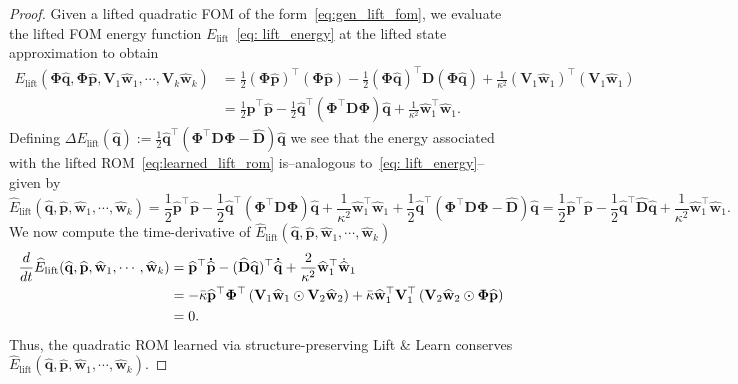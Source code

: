\documentclass[10pt,a4paper]{amsart}
\newcommand{\D}{\mathbf D}
\newcommand{\Dhat}{\widehat{\D}}
\newcommand{\V}{\mathbf V}
\newcommand{\bPhi}{\mathbf{\Phi}}
\newcommand{\dd}{\rm d}
\newcommand{\p}{\mathbf p}
\newcommand{\phat}{\widehat{\p}}
\newcommand{\phatdot}{\mathbf{\dot{\widehat p}}}
\newcommand{\q}{\mathbf q}
\newcommand{\qhat}{\widehat{\q}}
\newcommand{\qhatdot}{\mathbf{\dot{\widehat q}}}
\newcommand{\w}{\mathbf w}
\newcommand{\what}{\widehat{\w}}
\begin{document}
\begin{proof}
Given a lifted quadratic FOM of the form~\eqref{eq:gen_lift_fom}, we evaluate the lifted FOM energy function $E_{\text{lift}}$~\eqref{eq: lift_energy} at the lifted state approximation to obtain
\begin{align}
\label{eq:lift_energy}
E_{\text{lift}}(\bPhi\qhat,\bPhi\phat,\V_{1}\what_1, \cdots,\V_{k}\what_{k})&=\frac{1}{2}(\bPhi\phat)^\top(\bPhi\phat) - \frac{1}{2}(\bPhi\qhat)^\top \D(\bPhi\qhat) + \frac{1}{\kappa^2}(\V_{1}\what_1)^\top(\V_{1}\what_1) \nonumber\\
&=\frac{1}{2}\phat^\top\phat - \frac{1}{2}\qhat^\top (\bPhi^\top\D\bPhi )\qhat + \frac{1}{\kappa^2}\what_1^\top\what_1.
\end{align}
Defining $\Delta E_{\mathrm{lift}}(\qhat):=\frac{1}{2}\qhat^\top (\bPhi^\top\D\bPhi-\Dhat)\qhat$ we see that the energy associated with the lifted ROM~\eqref{eq:learned_lift_rom} is--analogous to~\eqref{eq: lift_energy}--given by
\begin{equation*}
\widehat{E}_{\text{lift}}(\qhat,\phat,\what_1, \cdots,  \what_{k})=\frac{1}{2}\phat^\top\phat - \frac{1}{2}\qhat^\top (\bPhi^\top\D\bPhi )\qhat + \frac{1}{\kappa^2}\what_1^\top\what_1 + \frac{1}{2}\qhat^\top (\bPhi^\top\D\bPhi-\Dhat)\qhat=\frac{1}{2}\phat^\top\phat - \frac{1}{2}\qhat^\top \Dhat\qhat +\frac{1}{\kappa^2} \what_1^\top\what_1. 
\end{equation*}
We now compute the time-derivative of $\widehat{E}_{\text{lift}}(\qhat,\phat,\what_1, \cdots,  \what_{k})$
\begin{align*} 
    \frac{\dd}{\dd t}\widehat{E}_{\text{lift}}(\qhat,\phat,\what_1, \cdots,\what_{k})&=\phat^\top\phatdot - (\Dhat\qhat)^\top\qhatdot +\frac{2}{\kappa^2} \what_1^\top\dot{\what}_1 \\
    &=-\bar{\kappa}\phat^\top\bPhi^\top\left( \V_{1}\what_1 \odot  \V_{2}\what_2\right) +  \bar{\kappa} \what_1^\top\V_{1}^\top \left( \V_{2}\what_2 \odot \bPhi\phat\right)\\
    &= 0. 
        \end{align*}
Thus, the quadratic ROM learned via structure-preserving Lift \& Learn conserves $\widehat{E}_{\text{lift}}(\qhat,\phat,\what_1, \cdots,\what_{k})$.
\end{proof}
\end{document}
